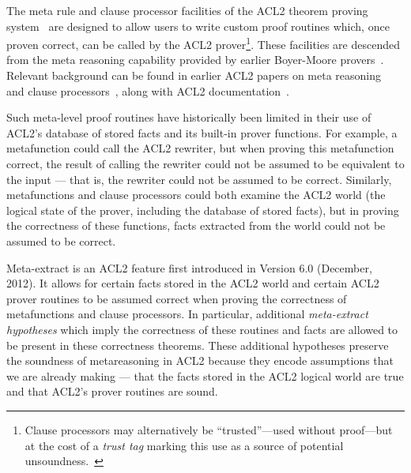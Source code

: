 The meta rule and clause processor facilities
of the ACL2 theorem proving system~\cite{acl2:home}
are designed to allow
users to write custom proof routines which, once proven
correct, can be called by the ACL2 prover\footnote{
  Clause processors may alternatively be ``trusted''---used without proof---but at the
  cost of a {\em trust tag} marking this use as a source of potential
  unsoundness.~\cite{trusted-cl-proc}}.
These facilities are descended from the meta reasoning capability
provided by earlier Boyer-Moore provers~\cite{meta}.  Relevant
background can be found in earlier ACL2 papers on meta
reasoning~\cite{meta-05} and clause processors~\cite{trusted-cl-proc},
along with ACL2 documentation~\cite{acl2:doc}.

Such meta-level proof routines have historically been limited in their use of
ACL2's database of stored facts and its built-in prover functions.
For example, a metafunction could call the ACL2 rewriter, but when
proving this metafunction correct, the result of calling the rewriter
could not be assumed to be equivalent to the input --- that is, the
rewriter could not be assumed to be correct.  Similarly,
metafunctions and clause processors could both examine the ACL2 world
(the logical state of the prover, including the database of stored
facts), but in proving the correctness of these functions, facts
extracted from the world could not be assumed to be correct.

Meta-extract is an ACL2 feature first introduced in Version 6.0
(December, 2012).  It allows for certain facts stored in the ACL2
world and certain ACL2 prover routines to be assumed
correct when proving the correctness of metafunctions and clause
processors.  In particular, additional \textit{meta-extract hypotheses}
which imply the correctness of these routines and facts are allowed to
be present in these correctness theorems. These additional hypotheses
preserve the soundness of metareasoning in ACL2 because they encode
assumptions that we are already
making --- that the facts stored in the ACL2 logical world are true
and that ACL2's prover routines are sound.

